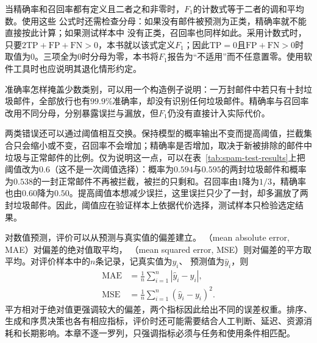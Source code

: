 当精确率和召回率都有定义且二者之和非零时，$F_1$的计数式等于二者的调和平均数。使用这些
公式时还需检查分母：如果没有邮件被预测为正类，精确率就不能直接按此计算；如果测试样本中
没有正类，召回率也同样如此。采用计数式时，只要$2\mathrm{TP}+\mathrm{FP}+\mathrm{FN}>0$，本书就以该式定义$F_1$；因此$\mathrm{TP}=0$且$\mathrm{FP}+\mathrm{FN}>0$时取值为0。三项全为0时分母为零，本书将$F_1$报告为“不适用”而不任意置零。使用软件工具时也应说明其退化情形约定。

准确率怎样掩盖少数类别，可以用一个构造例子说明：一万封邮件中若只有十封垃圾邮件，全部放行也有$99.9\%$准确率，却没有识别任何垃圾邮件。精确率与召回率改用不同分母，分别暴露误拦与漏放，但$F_1$仍没有直接计入实际代价。

两类错误还可以通过阈值相互交换。保持模型的概率输出不变而提高阈值，拦截集合只会缩小或不变，召回率不会增加；精确率是否增加，取决于新被排除的邮件中垃圾与正常邮件的比例。仅为说明这一点，可以在表~\ref{tab:spam-test-results}上把阈值改为$0.6$（这不是一次阈值选择）：概率为$0.594$与$0.595$的两封垃圾邮件和概率为$0.538$的一封正常邮件不再被拦截，被拦的只剩和。召回率由$1$降为$1/3$，精确率也由$0.60$降为$0.50$。提高阈值本想减少误拦，这里误拦只少了一封，却多漏放了两封垃圾邮件。因此，阈值应在验证样本上依据代价选择，测试样本只检验选定结果。

对数值预测，评价可以从预测与真实值的偏差建立。
（mean absolute error, MAE）对偏差的绝对值取平均，
（mean squared error, MSE）则对偏差的平方取平均。对评价样本中的$n$条记录，记真实值为$y_i$、
预测值为$\hat{y}_i$，则
\begin{align}
  \operatorname{MAE}
    &=\frac{1}{n}\sum_{i=1}^{n}|\hat{y}_i-y_i|,\\
  \operatorname{MSE}
    &=\frac{1}{n}\sum_{i=1}^{n}(\hat{y}_i-y_i)^2.
\end{align}
平方相对于绝对值更强调较大的偏差，两个指标因此给出不同的误差权重。排序、生成和序贯决策也各有相应指标，评价时还可能需要结合人工判断、延迟、资源消耗和长期影响。本章不逐一罗列，只强调指标必须与任务和使用条件相匹配。

